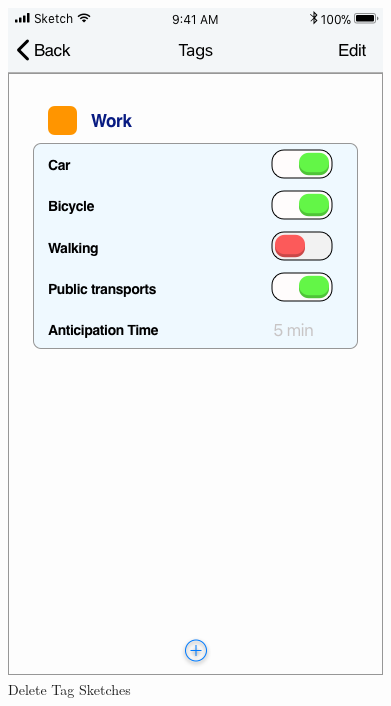 \begin{figure}[H]
	\hspace{0.5cm}
	\includegraphics[scale=0.23]{Images/Interface/Tags/8_tags+work}
	\caption{Delete Tag Sketches}
\end{figure}

